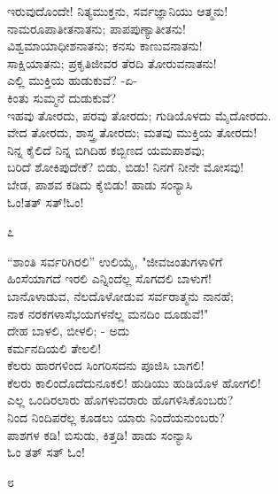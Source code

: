 \begin{myquote}
ಇರುವುದೊಂದೇ! ನಿತ್ಯಮುಕ್ತನು, ಸರ್ವಜ್ಞಾನಿಯು ಆತ್ಮನು!\\ನಾಮರೂಪಾತೀತನಾತನು; ಪಾಪಪುಣ್ಯಾತೀತನು!\\ವಿಶ್ವಮಾಯಾಧೀಶನಾತನು; ಕನಸು ಕಾಣುವನಾತನು!\\ಸಾಕ್ಷಿಯಾತನು; ಪ್ರಕೃತಿಜೀವರ ತೆರದಿ ತೋರುವನಾತನು!\\ಎಲ್ಲಿ ಮುಕ್ತಿಯ ಹುಡುಕುವೆ? -ಏ-\\ಕಿಂತು ಸುಮ್ಮನೆ ದುಡುಕುವೆ?\\ಇಹವು ತೋರದು, ಪರವು ತೋರದು; ಗುಡಿಯೊಳದು ಮೈದೋರದು.\\ವೇದ ತೋರದು, ಶಾಸ್ತ್ರ ತೋರದು; ಮತವು ಮುಕ್ತಿಯ ತೋರದು!\\ನಿನ್ನ ಕೈಲಿದೆ ನಿನ್ನ ಬಿಗಿದಿಹ ಕಬ್ಬಿಣದ ಯಮಪಾಶವು;\\ಬರಿದೆ ಶೋಕಿಪುದೇಕೆ? ಬಿಡು, ಬಿಡು! ನಿನಗೆ ನೀನೇ ಮೋಸವು!\\ಬೇಡ, ಪಾಶವ ಕಡಿದು ಕೈಬಿಡು! ಹಾಡು ಸಂನ್ಯಾಸಿ\\ಓಂ!ತತ್ ಸತ್!ಓಂ!
\end{myquote}

\begin{center}
೭
\end{center}

\begin{myquote}
“ಶಾಂತಿ ಸರ್ವರಿಗಿರಲಿ” ಉಲಿಯೈ, "ಜೀವಜಂತುಗಳಾಳಿಗೆ\\ಹಿಂಸೆಯಾಗದೆ ಇರಲಿ ಎನ್ನಿಂದೆಲ್ಲ ಸೊಗದಲಿ ಬಾಳುಗೆ!\\ಬಾನೊಳಾಡುವ, ನೆಲದೊಳೋಡುವ ಸರ್ವರಾತ್ಮನು ನಾನಹೆ;\\ನಾಕ ನರಕಗಳಾಸೆಭಯಗಳನೆಲ್ಲ ಮನದಿಂ ದೂಡುವೆ!"\\ದೇಹ ಬಾಳಲಿ, ಬೀಳಲಿ; - ಅದು\\ಕರ್ಮನದಿಯಲಿ ತೇಲಲಿ!\\ಕೆಲರು ಹಾರಗಳಿಂದ ಸಿಂಗರಿಸದನು ಪೂಜಿಸಿ ಬಾಗಲಿ!\\ಕೆಲರು ಕಾಲಿಂದೊದೆದುನೂಕಲಿ! ಹುಡಿಯು ಹುಡಿಯೊಳ ಹೋಗಲಿ!\\ಎಲ್ಲ ಒಂದಿರಲಾರು ಹೊಗಳುವರಾರು ಹೊಗಳಿಸಿಕೊಂಬರು?\\ನಿಂದ ನಿಂದಿಪರೆಲ್ಲ ಕೂಡಲು ಯಾರು ನಿಂದೆಯನುಂಬರು?\\ಪಾಶಗಳ ಕಡಿ! ಬಿಸುಡು, ಕಿತ್ತಡಿ! ಹಾಡು ಸಂನ್ಯಾಸಿ\\ಓಂ ತತ್ ಸತ್ ಓಂ!
\end{myquote}

\begin{center}
೮
\end{center}

